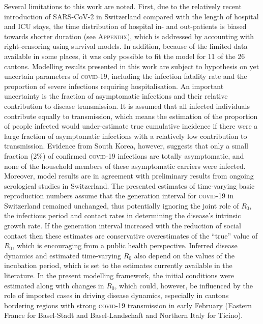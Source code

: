   Several limitations to this work are noted. First, due to the relatively recent introduction of SARS-CoV-2 in Switzerland compared with the length of hospital and ICU stays, the time distribution of hospital in- and out-patients is biased towards shorter duration (see \textsc{Appendix}), which is addressed by accounting with right-censoring using survival models. In addition, because of the limited data available in some places, it was only possible to fit the model for 11 of the 26 cantons. Modelling results presented in this work are subject to hypothesis on yet uncertain parameters of \textsc{covid}-19, including the infection fatality rate and the proportion of severe infections requiring hospitalisation. An important uncertainty is the fraction of asymptomatic infections and their relative contribution to disease transmission. It is assumed that all infected individuals contribute equally to transmission, which means the estimation of the proportion of people infected would under-estimate true cumulative incidence if there were a large fraction of asymptomatic infections with a relatively low contribution to transmission. Evidence from South Korea, however, suggests that only a small fraction (2\%) of confirmed \textsc{covid}-19 infections are totally asymptomatic, and none of the household members of these asymptomatic carriers were infected\cite[-4\baselineskip]{Park:EarlyReleaseCoronavirus:2020}. Moreover, model results are in agreement with preliminary results from ongoing serological studies in Switzerland\cite[-2\baselineskip]{Stringhini:RepeatedSeroprevalenceAntiSARSCoV2:2020}.  The presented estimates of time-varying basic reproduction numbers assume that the generation interval for \textsc{covid}-19 in Switzerland remained unchanged, thus potentially ignoring the joint role of $R_0$, the infectious period and contact rates in determining the disease’s intrinsic growth rate\cite{Yan:SeparateRolesLatent:2008}. If the generation interval increased with the reduction of social contact then these estimates are conservative overestimates of the “true” value of $R_0$, which is encouraging from a public health perspective. Inferred disease dynamics and estimated time-varying $R_0$ also depend on the values of the incubation period, which is set to the estimates currently available in the literature. 
  In the present modelling framework, the initial conditions were estimated along with changes in $R_0$, which could, however, be influenced by the role of imported cases in driving disease dynamics, especially in cantons bordering regions with strong \textsc{covid}-19 transmission in early February (Eastern France for Basel-Stadt and Basel-Landschaft and Northern Italy for Ticino). 
